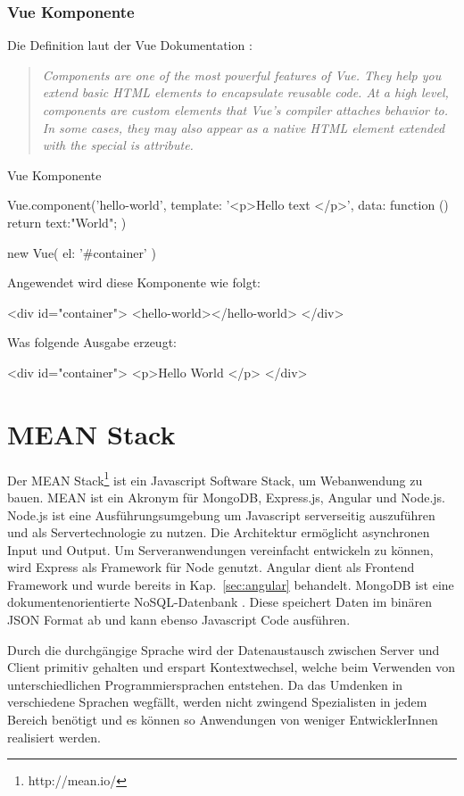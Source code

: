 \subsubsection{Vue Komponente}
Die Definition laut der Vue Dokumentation \cite{vue-component}: 
\begin{quote}
	\begin{english}
		\textit{Components are one of the most powerful features of Vue. They help you extend basic HTML elements to encapsulate reusable code. At a high level, components are custom elements that Vue’s compiler attaches behavior to. In some cases, they may also appear as a native HTML element extended with the special is attribute.}
	\end{english}
\end{quote}

\begin{program}[!htbp]
\caption{Vue Komponente}
\begin{JsCode}
	Vue.component('hello-world', {
		template: '<p>Hello {{ text }} </p>',
		data: function () {
			return {text:"World"};
		}
	})

	new Vue({
		el: '#container'
	})
\end{JsCode}
\end{program}

Angewendet wird diese Komponente wie folgt:
\begin{JsCode}[numbers=none]
<div id="container">
	<hello-world></hello-world>
</div>
\end{JsCode}

Was folgende Ausgabe erzeugt:
\begin{JsCode}[numbers=none]
<div id="container">
	<p>Hello World </p>
</div>
\end{JsCode}

\section%
{MEAN Stack}%
\label{cha:mean-stack}
Der MEAN Stack\footnote{http://mean.io/} ist ein Javascript Software Stack, um Webanwendung zu bauen. MEAN ist ein Akronym für MongoDB, Express.js, Angular und Node.js. 
Node.js ist eine Ausführungsumgebung um Javascript serverseitig auszuführen und als Servertechnologie zu nutzen. Die Architektur ermöglicht asynchronen Input und Output. Um Serveranwendungen vereinfacht entwickeln zu können, wird Express als Framework für Node genutzt. 
Angular dient als Frontend Framework und wurde bereits in Kap.~\ref{sec:angular} behandelt. MongoDB ist eine dokumentenorientierte NoSQL-Datenbank \cite{noSQL}. Diese speichert Daten im binären JSON Format ab und kann ebenso Javascript Code ausführen.

Durch die durchgängige Sprache wird der Datenaustausch zwischen Server und Client primitiv gehalten und erspart Kontextwechsel, welche beim Verwenden von unterschiedlichen Programmiersprachen entstehen. Da das Umdenken in verschiedene Sprachen wegfällt, werden nicht zwingend Spezialisten in jedem Bereich benötigt und es können so Anwendungen von weniger EntwicklerInnen realisiert werden. 
